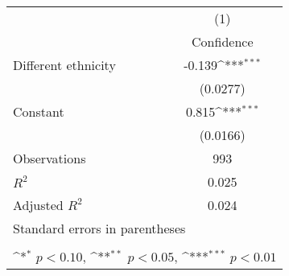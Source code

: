 {
\def\sym#1{\ifmmode^{#1}\else\(^{#1}\)\fi}
\begin{tabular}{l*{1}{c}}
\hline\hline
                    &\multicolumn{1}{c}{(1)}\\
                    &\multicolumn{1}{c}{Confidence}\\
\hline
Different ethnicity &      -0.139\sym{***}\\
                    &    (0.0277)         \\
[1em]
Constant            &       0.815\sym{***}\\
                    &    (0.0166)         \\
\hline
Observations        &         993         \\
\(R^{2}\)           &       0.025         \\
Adjusted \(R^{2}\)  &       0.024         \\
\hline\hline
\multicolumn{2}{l}{\footnotesize Standard errors in parentheses}\\
\multicolumn{2}{l}{\footnotesize }\\
\multicolumn{2}{l}{\footnotesize \sym{*} \(p<0.10\), \sym{**} \(p<0.05\), \sym{***} \(p<0.01\)}\\
\end{tabular}
}
